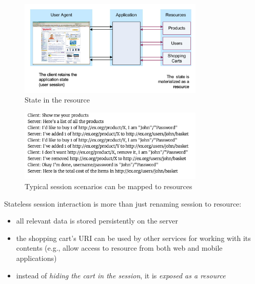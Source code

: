 \documentclass[10pt,a4paper]{article}
\begin{document}
   \begin{figure}[ht!]
 \hfill \includegraphics[width=250pt]{images/state-resource}
 \hspace*{\fill}
 \caption{State in the resource}
 \end{figure}
 \pagebreak
    \begin{figure}[ht!]
 \hfill \includegraphics[width=250pt]{images/session-scenarios-example}
 \hspace*{\fill}
 \caption{Typical session scenarios can be mapped to resources}
 \end{figure}
 Stateless session interaction is more than just renaming session to resource:
 \begin{itemize}
 	\item all relevant data is stored persistently on the server
 	\item the shopping cart's URI can be used by other services for working with its contents (e.g., allow access to resource from both web and mobile applications)
 	\item instead of \textit{hiding the cart in the session}, it is \textit{exposed as a resource}
 \end{itemize}
\end{document}
